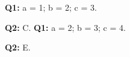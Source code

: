 \documentclass[11pt,a4paper]{article}
\begin{document}
\cabecalhoGabarito
{}
\textbf{Q1:} a = 1; b = 2; c = 3.\par
\textbf{Q2:} C.
\newpage
\cabecalhoGabarito
{}
\textbf{Q1:} a = 2; b = 3; c = 4.\par
\textbf{Q2:} E.
\end{document}
